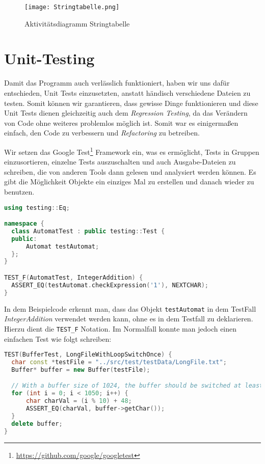 \begin{figure}[!htb]
    \centering
      \texttt{[image: Stringtabelle.png]}
    \caption{Aktivitätsdiagramm Stringtabelle}\label{fig:stringtabelle}
\end{figure}

\section{Unit-Testing}\label{sec:UnitTests}
Damit das Programm auch verlässlich funktioniert, haben wir uns dafür entschieden, Unit Tests einzusetzten, anstatt händisch verschiedene Dateien zu testen. Somit können wir garantieren, dass gewisse Dinge funktionieren und diese Unit Tests dienen gleichzeitig auch dem \textit{Regression Testing}, da das Verändern von Code ohne weiteres problemlos möglich ist. Somit war es einigermaßen einfach, den Code zu verbessern und \textit{Refactoring} zu betreiben.

Wir setzen das Google Test\footnote{\url{https://github.com/google/googletest}} Framework ein, was es ermöglicht, Tests in Gruppen einzusortieren, einzelne Tests auszuschalten und auch Ausgabe-Dateien zu schreiben, die von anderen Tools dann gelesen und analysiert werden können. Es gibt die Möglichkeit Objekte ein einziges Mal zu erstellen und danach wieder zu benutzen.

\begin{lstlisting}[language=C++, caption=Unit Test mit wiederverwendbarem Objekt]
using testing::Eq;

namespace {
  class AutomatTest : public testing::Test {
  public:
      Automat testAutomat;
  };
}

TEST_F(AutomatTest, IntegerAddition) {
  ASSERT_EQ(testAutomat.checkExpression('1'), NEXTCHAR);
}
\end{lstlisting}

In dem Beispielcode erkennt man, dass das Objekt \texttt{testAutomat} in dem TestFall \emph{IntegerAddition} verwendet werden kann, ohne es in dem Testfall zu deklarieren. Hierzu dient die \texttt{TEST\_F} Notation. Im Normalfall konnte man jedoch einen einfachen Test wie folgt schreiben:

\begin{lstlisting}[language=C++, caption=Einfacher Unit Test]
TEST(BufferTest, LongFileWithLoopSwitchOnce) {
  char const *testFile = "../src/test/testData/LongFile.txt";
  Buffer* buffer = new Buffer(testFile);

  // With a buffer size of 1024, the buffer should be switched at least once
  for (int i = 0; i < 1050; i++) {
      char charVal = (i % 10) + 48;
      ASSERT_EQ(charVal, buffer->getChar());
  }
  delete buffer;
}
\end{lstlisting}

